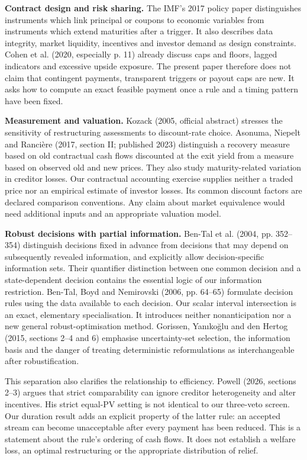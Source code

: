 \documentclass[11pt,a4paper]{article}
\begin{document}
\textbf{Contract design and risk sharing.} The IMF's 2017 policy paper distinguishes instruments which link principal or coupons to economic variables from instruments which extend maturities after a trigger. It also describes data integrity, market liquidity, incentives and investor demand as design constraints. Cohen et al. (2020, especially p. 11) already discuss caps and floors, lagged indicators and excessive upside exposure. The present paper therefore does not claim that contingent payments, transparent triggers or payout caps are new. It asks how to compute an exact feasible payment once a rule and a timing pattern have been fixed.

\textbf{Measurement and valuation.} Kozack (2005, official abstract) stresses the sensitivity of restructuring assessments to discount-rate choice. Asonuma, Niepelt and Ranci\`ere (2017, section II; published 2023) distinguish a recovery measure based on old contractual cash flows discounted at the exit yield from a measure based on observed old and new prices. They also study maturity-related variation in creditor losses. Our contractual accounting exercise supplies neither a traded price nor an empirical estimate of investor losses. Its common discount factors are declared comparison conventions. Any claim about market equivalence would need additional inputs and an appropriate valuation model.

\textbf{Robust decisions with partial information.} Ben-Tal et al. (2004, pp. 352--354) distinguish decisions fixed in advance from decisions that may depend on subsequently revealed information, and explicitly allow decision-specific information sets. Their quantifier distinction between one common decision and a state-dependent decision contains the essential logic of our information restriction. Ben-Tal, Boyd and Nemirovski (2006, pp. 64--65) formulate decision rules using the data available to each decision. Our scalar interval intersection is an exact, elementary specialisation. It introduces neither nonanticipation nor a new general robust-optimisation method. Gorissen, Yan\i ko\u glu and den Hertog (2015, sections 2--4 and 6) emphasise uncertainty-set selection, the information basis and the danger of treating deterministic reformulations as interchangeable after robustification.

This separation also clarifies the relationship to efficiency. Powell (2026, sections 2--3) argues that strict comparability can ignore creditor heterogeneity and alter incentives. His strict equal-PV setting is not identical to our three-veto screen. Our duration result adds an explicit property of the latter rule: an accepted stream can become unacceptable after every payment has been reduced. This is a statement about the rule's ordering of cash flows. It does not establish a welfare loss, an optimal restructuring or the appropriate distribution of relief.
\end{document}
